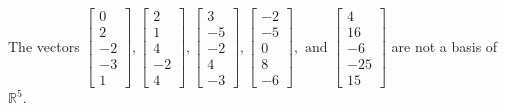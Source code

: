 \begin{exercise}
\begin{exerciseStatement}
  \end{exerciseStatement}
  \begin{exerciseAnswer}
   The vectors \(\left[\begin{array}{r}
0 \\
2 \\
-2 \\
-3 \\
1
\end{array}\right] , \left[\begin{array}{r}
2 \\
1 \\
4 \\
-2 \\
4
\end{array}\right] , \left[\begin{array}{r}
3 \\
-5 \\
-2 \\
4 \\
-3
\end{array}\right] , \left[\begin{array}{r}
-2 \\
-5 \\
0 \\
8 \\
-6
\end{array}\right] , \text{ and } \left[\begin{array}{r}
4 \\
16 \\
-6 \\
-25 \\
15
\end{array}\right]\) 
  	 are not  a basis of \(\mathbb{R}^5\).
  


  \end{exerciseAnswer}
\end{exercise}